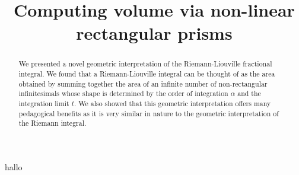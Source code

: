 \documentclass{article}
\theoremstyle{theorem}
\theoremstyle{definition}
\begin{document}
\title{Computing volume via non-linear rectangular prisms}

\maketitle



\noindent

hallo

\begin{abstract}
We presented a novel geometric interpretation of the Riemann-Liouville fractional integral. We found that a Riemann-Liouville integral can 
be thought of as the area obtained by summing together the area of an infinite number of non-rectangular infinitesimals whose shape is determined by the 
order of integration $\alpha$ and the integration limit $t$. We also showed that this geometric interpretation offers many pedagogical benefits as it is very similar
in nature to the geometric interpretation of the Riemann integral.   
\end{abstract}
\end{document}
